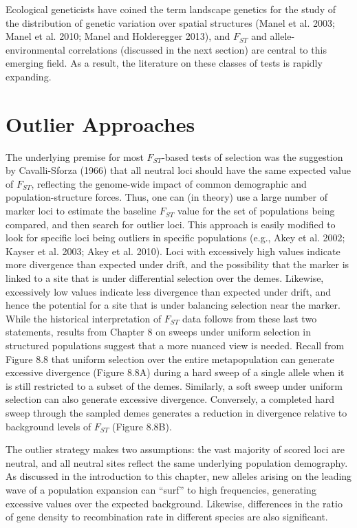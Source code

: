 \documentclass{article}
\begin{document}
Ecological geneticists have coined the term landscape genetics for the study of the distribution of genetic variation over spatial structures (Manel et al. 2003; Manel et al. 2010; Manel and Holderegger 2013), and  $ F_{ST} $ and allele-environmental correlations (discussed in the next section) are central to this emerging field. As a result, the literature on these classes of tests is rapidly expanding.

\section{Outlier Approaches}
The underlying premise for most  $ F_{ST} $-based tests of selection was the suggestion by Cavalli-Sforza (1966) that all neutral loci should have the same expected value of  $ F_{ST} $, reflecting the genome-wide impact of common demographic and population-structure forces. Thus, one can (in theory) use a large number of marker loci to estimate the baseline  $ F_{ST} $ value for the set of populations being compared, and then search for outlier loci. This approach is easily modified to look for specific loci being outliers in specific populations (e.g., Akey et al. 2002; Kayser et al. 2003; Akey et al. 2010). Loci with excessively high values indicate more divergence than expected under drift, and the possibility that the marker is linked to a site that is under differential selection over the demes. Likewise, excessively low values indicate less divergence than expected under drift, and hence the potential for a site that is under balancing selection near the marker. While the historical interpretation of  $ F_{ST} $ data follows from these last two statements, results from Chapter 8 on sweeps under uniform selection in structured populations suggest that a more nuanced view is needed. Recall from Figure 8.8 that uniform selection over the entire metapopulation can generate excessive divergence (Figure 8.8A) during a hard sweep of a single allele when it is still restricted to a subset of the demes. Similarly, a soft sweep under uniform selection can also generate excessive divergence. Conversely, a completed hard sweep through the sampled demes generates a reduction in divergence relative to background levels of  $ F_{ST} $ (Figure 8.8B).

The outlier strategy makes two assumptions: the vast majority of scored loci are neutral, and all neutral sites reflect the same underlying population demography. As discussed in the introduction to this chapter, new alleles arising on the leading wave of a population expansion can “surf” to high frequencies, generating excessive values over the expected background. Likewise, differences in the ratio of gene density to recombination rate in different species are also significant.
\end{document}
